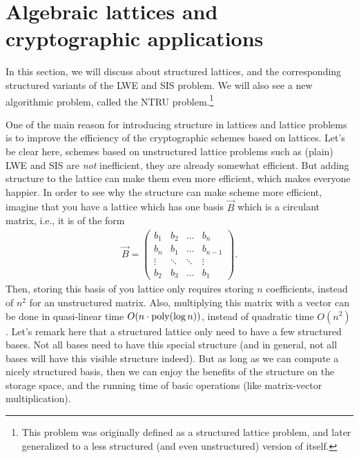 \section{Algebraic lattices and cryptographic applications}


In this section, we will discuss about structured lattices, and the corresponding structured variants of the LWE and SIS problem. We will also see a new algorithmic problem, called the NTRU problem.\footnote{This problem was originally defined as a structured lattice problem, and later generalized to a less structured (and even unstructured) version of itself.}

One of the main reason for introducing structure in lattices and lattice problems is to improve the efficiency of the cryptographic schemes based on lattices. Let's be clear here, schemes based on unstructured lattice problems such as (plain) LWE and SIS are \emph{not} inefficient, they are already somewhat efficient. But adding structure to the lattice can make them even more efficient, which makes everyone happier.
In order to see why the structure can make scheme more efficient, imagine that you have a lattice which has one basis $\vec B$ which is a circulant matrix, i.e., it is of the form
\begin{align*}
\vec B = \begin{pmatrix}
b_{1} & b_{2} & \dots & b_n \\
b_n & b_1 & \dots & b_{n-1} \\
\vdots & \ddots & \ddots & \vdots \\
b_{2} & b_3 & \dots & b_1
\end{pmatrix}.
\end{align*}
Then, storing this basis of you lattice only requires storing $n$ coefficients, instead of $n^2$ for an unstructured matrix. Also, multiplying this matrix with a vector can be done in quasi-linear time $O(n \cdot \operatorname{poly}( \log n) )$, instead of quadratic time $O(n^2)$.
Let's remark here that a structured lattice only need to have a few structured bases. Not all bases need to have this special structure (and in general, not all bases will have this visible structure indeed). But as long as we can compute a nicely structured basis, then we can enjoy the benefits of the structure on the storage space, and the running time of basic operations (like matrix-vector multiplication).

